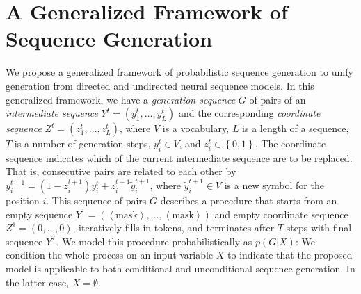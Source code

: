 \documentclass{article}
\begin{document}
\section{A Generalized Framework of Sequence Generation}
\label{sec:generalized_sequence_generation}

We propose a generalized framework of probabilistic sequence generation to unify generation from directed and undirected neural sequence models. In this generalized framework, we have a {\it generation sequence} $G$ of pairs of an {\it intermediate sequence} $Y^t=(y^t_1, \ldots, y^t_L)$ and the corresponding {\it coordinate sequence} $Z^t=(z^t_1, \ldots, z^t_L)$, where $V$ is a vocabulary, $L$ is a length of a sequence, $T$ is a number of generation steps, $y^t_i \in V$, and $z^t_i \in \left\{0, 1\right\}$. The coordinate sequence indicates which of the current intermediate sequence are to be replaced. That is, consecutive pairs are related to each other by
    $y^{t+1}_i = 
    (1-z^{t+1}_i) y^t_i + 
    z^{t+1}_i \tilde{y}^{t+1}_i$,
where $\tilde{y}^{t+1}_i \in V$ is a new symbol for the position $i$. This sequence of pairs $G$ describes a procedure that starts from an empty sequence \mbox{$Y^1=(\left<\text{mask}\right>, \ldots, \left<\text{mask}\right>)$} and empty coordinate sequence $Z^1=(0, ..., 0)$, iteratively fills in tokens, and terminates after $T$ steps with final sequence $Y^{T}$. 
We model this procedure probabilistically as $p(G|X)$:
We condition the whole process on an input variable $X$ to indicate that the proposed model is applicable to both conditional and unconditional sequence generation. In the latter case, $X=\emptyset$.
\end{document}
